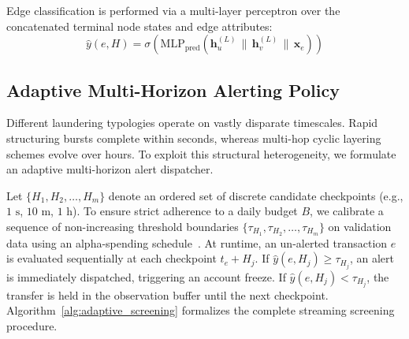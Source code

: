 \documentclass[pdflatex,sn-mathphys,Numbered]{sn-jnl}
\theoremstyle{thmstyleone}
\theoremstyle{thmstyletwo}
\theoremstyle{thmstylethree}
\begin{document}
Edge classification is performed via a multi-layer perceptron over the concatenated terminal node states and edge attributes:
\begin{equation}
\hat{y}(e, H) = \sigma\left(\text{MLP}_{\text{pred}}\left(\mathbf{h}_u^{(L)} \,\|\, \mathbf{h}_v^{(L)} \,\|\, \mathbf{x}_e\right)\right)
\end{equation}

\subsection{Adaptive Multi-Horizon Alerting Policy}
Different laundering typologies operate on vastly disparate timescales. Rapid structuring bursts complete within seconds, whereas multi-hop cyclic layering schemes evolve over hours. To exploit this structural heterogeneity, we formulate an adaptive multi-horizon alert dispatcher.

Let $\{H_1, H_2, \dots, H_m\}$ denote an ordered set of discrete candidate checkpoints (e.g., $1\text{ s}$, $10\text{ m}$, $1\text{ h}$). To ensure strict adherence to a daily budget $B$, we calibrate a sequence of non-increasing threshold boundaries $\{\tau_{H_1}, \tau_{H_2}, \dots, \tau_{H_m}\}$ on validation data using an alpha-spending schedule~\cite{lan1983alpha}. At runtime, an un-alerted transaction $e$ is evaluated sequentially at each checkpoint $t_e + H_j$. If $\hat{y}(e, H_j) \ge \tau_{H_j}$, an alert is immediately dispatched, triggering an account freeze. If $\hat{y}(e, H_j) < \tau_{H_j}$, the transfer is held in the observation buffer until the next checkpoint. Algorithm~\ref{alg:adaptive_screening} formalizes the complete streaming screening procedure.
\end{document}
